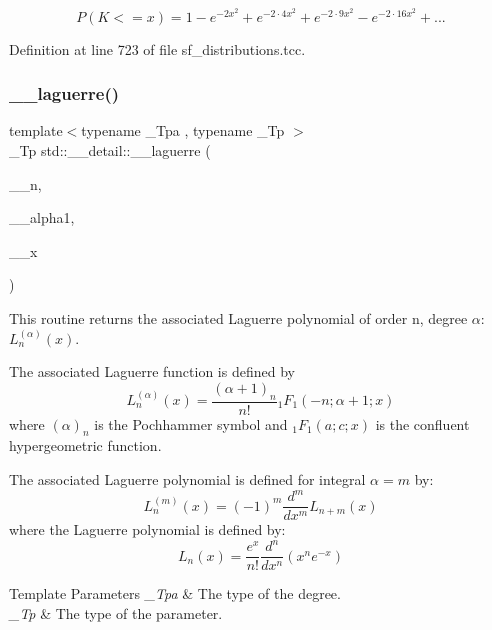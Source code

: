 \[ P(K <= x) = 1 - e^{-2x^2} + e^{-2 \cdot 4 x^2} + e^{-2 \cdot 9 x^2} - e^{-2 \cdot 16 x^2} + ... \] 

Definition at line 723 of file sf\+\_\+distributions.\+tcc.

\mbox{\label{namespacestd_1_1____detail_a9e0b69452cb6c0ca0115c516afd46816}} 
\subsubsection{\texorpdfstring{\+\_\+\+\_\+laguerre()}{\_\_laguerre()}\hspace{0.1cm}{\footnotesize\ttfamily [1/2]}}
{\footnotesize\ttfamily template$<$typename \+\_\+\+Tpa , typename \+\_\+\+Tp $>$ \\
\+\_\+\+Tp std\+::\+\_\+\+\_\+detail\+::\+\_\+\+\_\+laguerre (\begin{DoxyParamCaption}\item[{unsigned int}]{\+\_\+\+\_\+n,  }\item[{\+\_\+\+Tpa}]{\+\_\+\+\_\+alpha1,  }\item[{\+\_\+\+Tp}]{\+\_\+\+\_\+x }\end{DoxyParamCaption})}



This routine returns the associated Laguerre polynomial of order n, degree $ \alpha $\+: $ L_n^{(\alpha)}(x) $. 

The associated Laguerre function is defined by \[ L_n^{(\alpha)}(x) = \frac{(\alpha + 1)_n}{n!} {}_1F_1(-n; \alpha + 1; x) \] where $ (\alpha)_n $ is the Pochhammer symbol and $ {}_1F_1(a; c; x) $ is the confluent hypergeometric function.

The associated Laguerre polynomial is defined for integral $ \alpha = m $ by\+: \[ L_n^{(m)}(x) = (-1)^m \frac{d^m}{dx^m} L_{n + m}(x) \] where the Laguerre polynomial is defined by\+: \[ L_n(x) = \frac{e^x}{n!} \frac{d^n}{dx^n} (x^ne^{-x}) \]


\begin{DoxyTemplParams}{Template Parameters}
{\em \+\_\+\+Tpa} & The type of the degree. \\
\hline
{\em \+\_\+\+Tp} & The type of the parameter. \\
\hline
\end{DoxyTemplParams}

